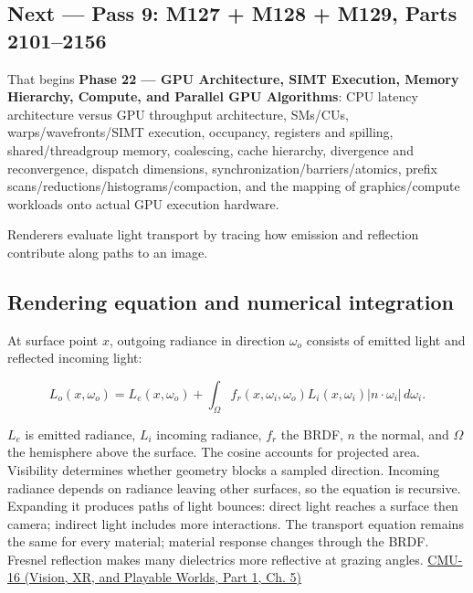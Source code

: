 \subsection{Next --- Pass 9: M127 + M128 + M129, Parts 2101--2156}\label{03-visual-computing-i-ch011-next-pass-9-m127-m128-m129-parts-21012156}

\hypertarget{03-visual-computing-i-ch011-next-pass-9-m127-m128-m129-parts-21012156}{}

That begins \textbf{Phase 22 --- GPU Architecture, SIMT Execution, Memory Hierarchy, Compute, and Parallel GPU Algorithms}: CPU latency architecture versus GPU throughput architecture, SMs/CUs, warps/wavefronts/SIMT execution, occupancy, registers and spilling, shared/threadgroup memory, coalescing, cache hierarchy, divergence and reconvergence, dispatch dimensions, synchronization/barriers/atomics, prefix scans/reductions/histograms/compaction, and the mapping of graphics/compute workloads onto actual GPU execution hardware.

Renderers evaluate light transport by tracing how emission and reflection contribute along paths to an image.

\subsection{Rendering equation and numerical integration}\label{03-visual-computing-i-ch011-rendering-equation-and-numerical-integration}

\hypertarget{03-visual-computing-i-ch011-rendering-equation-and-numerical-integration}{}

At surface point \(x\), outgoing radiance in direction \(\omega_o\) consists of emitted light and reflected incoming light:

\[
L_o(x,\omega_o)=L_e(x,\omega_o)+\int_\Omega f_r(x,\omega_i,\omega_o)L_i(x,\omega_i)|n\cdot\omega_i|\,d\omega_i.
\]

\(L_e\) is emitted radiance, \(L_i\) incoming radiance, \(f_r\) the BRDF, \(n\) the normal, and \(\Omega\) the hemisphere above the surface. The cosine accounts for projected area. Visibility determines whether geometry blocks a sampled direction. Incoming radiance depends on radiance leaving other surfaces, so the equation is recursive. Expanding it produces paths of light bounces: direct light reaches a surface then camera; indirect light includes more interactions. The transport equation remains the same for every material; material response changes through the BRDF. Fresnel reflection makes many dielectrics more reflective at grazing angles. \href{../07-Vision-XR-and-Playable-Worlds-P01/main.pdf\#04-visual-computing-ii-ch036-cmu-16---the-rendering-equation}{CMU-16 (Vision, XR, and Playable Worlds, Part 1, Ch. 5)}

